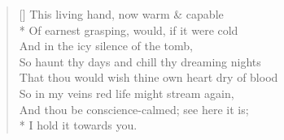 \documentclass[MAIN]{subfiles}
\begin{document}
\settowidth{\versewidth}{That thou would wish thine own heart dry of blood}
\begin{verse}[\versewidth]
This living hand, now warm \& capable\\*
Of earnest grasping, would, if it were cold\\
And in the icy silence of the tomb,\\
So haunt thy days and chill thy dreaming nights\\
That thou would wish thine own heart dry of blood\\
So in my veins red life might stream again,\\
And thou be conscience-calmed; see here it is;\\*
I hold it towards you.
\end{verse}
\end{document}
